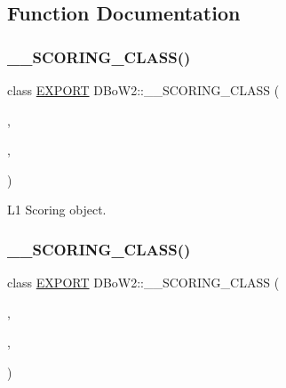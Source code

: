 \subsection{Function Documentation}
\mbox{\label{namespace_d_bo_w2_a366d1d4a75ab8276e171af0aaa04b29b}} 
\subsubsection{\texorpdfstring{\+\_\+\+\_\+\+S\+C\+O\+R\+I\+N\+G\+\_\+\+C\+L\+A\+S\+S()}{\_\_SCORING\_CLASS()}\hspace{0.1cm}{\footnotesize\ttfamily [1/6]}}
{\footnotesize\ttfamily class \mbox{\hyperlink{config_8h_a3472d8cdbb788d5f1815b3522595bc49}{E\+X\+P\+O\+RT}} D\+Bo\+W2\+::\+\_\+\+\_\+\+S\+C\+O\+R\+I\+N\+G\+\_\+\+C\+L\+A\+SS (\begin{DoxyParamCaption}\item[{L1\+Scoring}]{,  }\item[{true}]{,  }\item[{\mbox{\hyperlink{namespace_d_bo_w2_a53e9e0bcfc25c861815e413a7cf3fa51a94f5879ff083c0a8364805ae4f9c2d5c}{L1}}}]{ }\end{DoxyParamCaption})}



L1 Scoring object. 

\mbox{\label{namespace_d_bo_w2_a38216a543c4968d22bf2ffd2178e299c}} 
\subsubsection{\texorpdfstring{\+\_\+\+\_\+\+S\+C\+O\+R\+I\+N\+G\+\_\+\+C\+L\+A\+S\+S()}{\_\_SCORING\_CLASS()}\hspace{0.1cm}{\footnotesize\ttfamily [2/6]}}
{\footnotesize\ttfamily class \mbox{\hyperlink{config_8h_a3472d8cdbb788d5f1815b3522595bc49}{E\+X\+P\+O\+RT}} D\+Bo\+W2\+::\+\_\+\+\_\+\+S\+C\+O\+R\+I\+N\+G\+\_\+\+C\+L\+A\+SS (\begin{DoxyParamCaption}\item[{L2\+Scoring}]{,  }\item[{true}]{,  }\item[{\mbox{\hyperlink{namespace_d_bo_w2_a53e9e0bcfc25c861815e413a7cf3fa51aff96c9503798aa8504a954d3832e5eaa}{L2}}}]{ }\end{DoxyParamCaption})}



